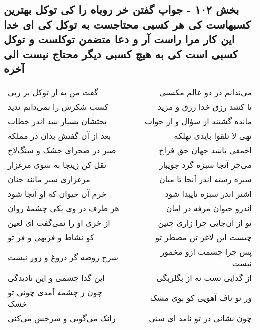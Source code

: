 \begin{center}
\section*{بخش ۱۰۲ - جواب گفتن خر روباه را کی توکل بهترین کسبهاست کی هر  کسبی محتاجست به توکل کی ای خدا این کار مرا راست آر و دعا  متضمن توکلست و توکل کسبی است کی به هیچ کسبی دیگر محتاج  نیست الی آخره}
\label{sec:sh102}
\begin{longtable}{l p{0.5cm} r}
گفت من به از توکل بر ربی
&&
می‌ندانم در دو عالم مکسبی
\\
کسب شکرش را نمی‌دانم ندید
&&
تا کشد رزق خدا رزق و مزید
\\
بحثشان بسیار شد اندر خطاب
&&
مانده گشتند از سؤال و از جواب
\\
بعد از آن گفتش بدان در مملکه
&&
نهی لا تلقوا بایدی تهلکه
\\
صبر در صحرای خشک و سنگ‌لاخ
&&
احمقی باشد جهان حق فراخ
\\
نقل کن زینجا به سوی مرغزار
&&
می‌چر آنجا سبزه گرد جویبار
\\
مرغزاری سبز مانند جنان
&&
سبزه رسته اندر آنجا تا میان
\\
خرم آن حیوان که او آنجا شود
&&
اشتر اندر سبزه ناپیدا شود
\\
هر طرف در وی یکی چشمهٔ روان
&&
اندرو حیوان مرفه در امان
\\
از خری او را نمی‌گفت ای لعین
&&
تو از آن‌جایی چرا زاری چنین
\\
کو نشاط و فربهی و فر تو
&&
چیست این لاغر تن مضطر تو
\\
شرح روضه گر دروغ و زور نیست
&&
پس چرا چشمت ازو مخمور نیست
\\
این گدا چشمی و این نادیدگی
&&
از گدایی تست نه از بگلربگی
\\
چون ز چشمه آمدی چونی تو خشک
&&
ور تو ناف آهویی کو بوی مشک
\\
زانک می‌گویی و شرحش می‌کنی
&&
چون نشانی در تو نامد ای سنی
\\
\end{longtable}
\end{center}
